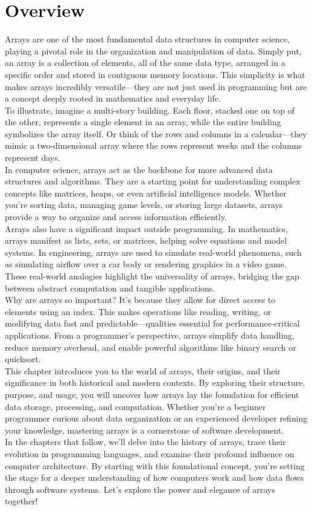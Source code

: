 \documentclass[12pt, oneside]{book}
\begin{document}
\section{Overview}
Arrays are one of the most fundamental data structures in computer science, playing a pivotal role in the organization and manipulation of data. Simply put, an array is a collection of elements, all of the same data type, arranged in a specific order and stored in contiguous memory locations. This simplicity is what makes arrays incredibly versatile—they are not just used in programming but are a concept deeply rooted in mathematics and everyday life.\\
To illustrate, imagine a multi-story building. Each floor, stacked one on top of the other, represents a single element in an array, while the entire building symbolizes the array itself. Or think of the rows and columns in a calendar—they mimic a two-dimensional array where the rows represent weeks and the columns represent days.\\
In computer science, arrays act as the backbone for more advanced data structures and algorithms. They are a starting point for understanding complex concepts like matrices, heaps, or even artificial intelligence models. Whether you’re sorting data, managing game levels, or storing large datasets, arrays provide a way to organize and access information efficiently.\\
Arrays also have a significant impact outside programming. In mathematics, arrays manifest as lists, sets, or matrices, helping solve equations and model systems. In engineering, arrays are used to simulate real-world phenomena, such as simulating airflow over a car body or rendering graphics in a video game. These real-world analogies highlight the universality of arrays, bridging the gap between abstract computation and tangible applications.\\
Why are arrays so important? It’s because they allow for direct access to elements using an index. This makes operations like reading, writing, or modifying data fast and predictable—qualities essential for performance-critical applications. From a programmer’s perspective, arrays simplify data handling, reduce memory overhead, and enable powerful algorithms like binary search or quicksort.\\
This chapter introduces you to the world of arrays, their origins, and their significance in both historical and modern contexts. By exploring their structure, purpose, and usage, you will uncover how arrays lay the foundation for efficient data storage, processing, and computation. Whether you're a beginner programmer curious about data organization or an experienced developer refining your knowledge, mastering arrays is a cornerstone of software development.\\
In the chapters that follow, we’ll delve into the history of arrays, trace their evolution in programming languages, and examine their profound influence on computer architecture. By starting with this foundational concept, you’re setting the stage for a deeper understanding of how computers work and how data flows through software systems. Let’s explore the power and elegance of arrays together!
\end{document}
